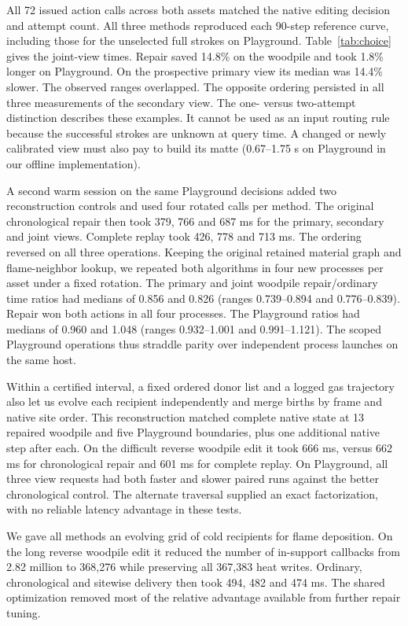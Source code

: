 All 72 issued action calls across both assets matched the native editing decision and attempt count. All three methods reproduced each 90-step reference curve, including those for the unselected full strokes on Playground. Table~\ref{tab:choice} gives the joint-view times. Repair saved 14.8\% on the woodpile and took 1.8\% longer on Playground. On the prospective primary view its median was 14.4\% slower. The observed ranges overlapped. The opposite ordering persisted in all three measurements of the secondary view. The one- versus two-attempt distinction describes these examples. It cannot be used as an input routing rule because the successful strokes are unknown at query time. A changed or newly calibrated view must also pay to build its matte (0.67--1.75 s on Playground in our offline implementation).


A second warm session on the same Playground decisions added two reconstruction controls and used four rotated calls per method. The original chronological repair then took 379, 766 and 687 ms for the primary, secondary and joint views. Complete replay took 426, 778 and 713 ms. The ordering reversed on all three operations. Keeping the original retained material graph and flame-neighbor lookup, we repeated both algorithms in four new processes per asset under a fixed rotation. The primary and joint woodpile repair/ordinary time ratios had medians of 0.856 and 0.826 (ranges 0.739--0.894 and 0.776--0.839). Repair won both actions in all four processes. The Playground ratios had medians of 0.960 and 1.048 (ranges 0.932--1.001 and 0.991--1.121). The scoped Playground operations thus straddle parity over independent process launches on the same host.

Within a certified interval, a fixed ordered donor list and a logged gas trajectory also let us evolve each recipient independently and merge births by frame and native site order. This reconstruction matched complete native state at 13 repaired woodpile and five Playground boundaries, plus one additional native step after each. On the difficult reverse woodpile edit it took 666 ms, versus 662 ms for chronological repair and 601 ms for complete replay. On Playground, all three view requests had both faster and slower paired runs against the better chronological control. The alternate traversal supplied an exact factorization, with no reliable latency advantage in these tests.


We gave all methods an evolving grid of cold recipients for flame deposition. On the long reverse woodpile edit it reduced the number of in-support callbacks from 2.82 million to 368,276 while preserving all 367,383 heat writes. Ordinary, chronological and sitewise delivery then took 494, 482 and 474 ms. The shared optimization removed most of the relative advantage available from further repair tuning.
